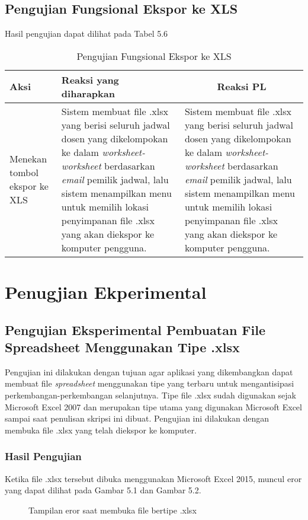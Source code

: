 \subsection{Pengujian Fungsional Ekspor ke XLS}
Hasil pengujian dapat dilihat pada Tabel 5.6
\begin{center}
	\begin{table}[H]
		\begin{tabular}{|p{5cm}|p{5cm}|p{5cm}|}
		\hline
		\centering Aksi	& 	\centering Reaksi yang diharapkan &  \multicolumn{1}{c|}{Reaksi PL} \\
		\hline
		Menekan tombol ekspor ke XLS & 
		Sistem membuat file .xlsx yang berisi seluruh jadwal dosen yang dikelompokan ke dalam \textit{worksheet-worksheet} berdasarkan \textit{email} pemilik jadwal, lalu sistem  menampilkan menu untuk memilih lokasi penyimpanan file .xlsx yang akan diekspor ke komputer pengguna. &
		Sistem membuat file .xlsx yang berisi seluruh jadwal dosen yang dikelompokan ke dalam \textit{worksheet-worksheet} berdasarkan \textit{email} pemilik jadwal, lalu sistem  menampilkan menu untuk memilih lokasi penyimpanan file .xlsx yang akan diekspor ke komputer pengguna. \\
		\hline
		\end{tabular}
		\caption{Pengujian Fungsional Ekspor ke XLS}
	\end{table}
\end{center}


\section{Penugjian Ekperimental}
\subsection{Pengujian Eksperimental Pembuatan File Spreadsheet Menggunakan Tipe .xlsx}
Pengujian ini dilakukan dengan tujuan agar aplikasi yang dikembangkan dapat membuat file \textit{spreadsheet} menggunakan tipe yang terbaru untuk mengantisipasi perkembangan-perkembangan selanjutnya. Tipe file .xlsx sudah digunakan sejak Microsoft Excel 2007 dan merupakan tipe utama yang digunakan Microsoft Excel sampai saat penulisan skripsi ini dibuat. Pengujian ini dilakukan dengan membuka file .xlsx yang telah diekspor ke komputer. 
\subsubsection{Hasil Pengujian}
Ketika file .xlsx tersebut dibuka menggunakan Microsoft Excel 2015, muncul eror yang dapat dilihat pada Gambar 5.1 dan Gambar 5.2.
\begin{figure} [H]
	\centering  
	\caption[Tampilan eror saat membuka file bertipe .xlsx]{Tampilan eror saat membuka file bertipe .xlsx} 
	\label{fig:flow-chart-CodeIgniter} 
\end{figure}

